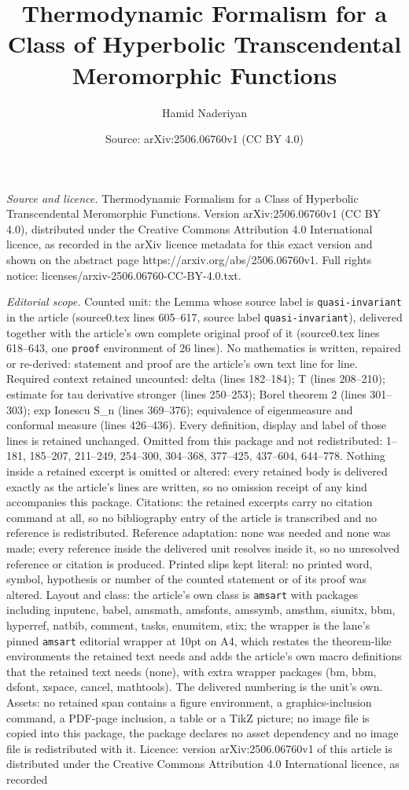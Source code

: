 \documentclass[10pt,a4paper]{amsart}
\title[Thermodynamic Formalism for a Class of Hyperbolic Transcende]{Thermodynamic Formalism for a Class of Hyperbolic Transcendental Meromorphic Functions}
\author{Hamid Naderiyan}
\date{Source: arXiv:2506.06760v1 (CC BY 4.0)}
\begin{document}
\maketitle

\noindent\emph{Source and licence.} Thermodynamic Formalism for a Class of Hyperbolic Transcendental Meromorphic Functions. Version arXiv:2506.06760v1 (CC BY 4.0), distributed under the Creative Commons Attribution 4.0 International licence, as recorded in the arXiv licence metadata for this exact version and shown on the abstract page https://arxiv.org/abs/2506.06760v1. Full rights notice: licenses/arxiv-2506.06760-CC-BY-4.0.txt.\par\smallskip

\noindent\textit{Editorial scope.} Counted unit: the Lemma whose source label is \texttt{quasi-invariant} in the article (source0.tex lines 605--617, source label \texttt{quasi-invariant}), delivered together with the article's own complete original proof of it (source0.tex lines 618--643, one \texttt{proof} environment of 26 lines). No mathematics is written, repaired or re-derived: statement and proof are the article's own text line for line. Required context retained uncounted: delta (lines 182--184); T (lines 208--210); estimate for tau derivative stronger (lines 250--253); Borel theorem 2 (lines 301--303); exp Ionescu S\_n (lines 369--376); equivalence of eigenmeasure and conformal measure (lines 426--436). Every definition, display and label of those lines is retained unchanged. Omitted from this package and not redistributed: 1--181, 185--207, 211--249, 254--300, 304--368, 377--425, 437--604, 644--778. Nothing inside a retained excerpt is omitted or altered: every retained body is delivered exactly as the article's lines are written, so no omission receipt of any kind accompanies this package. Citations: the retained excerpts carry no citation command at all, so no bibliography entry of the article is transcribed and no reference is redistributed. Reference adaptation: none was needed and none was made; every reference inside the delivered unit resolves inside it, so no unresolved reference or citation is produced. Printed slips kept literal: no printed word, symbol, hypothesis or number of the counted statement or of its proof was altered. Layout and class: the article's own class is \texttt{amsart} with packages including inputenc, babel, amsmath, amsfonts, amssymb, amsthm, siunitx, bbm, hyperref, natbib, comment, tasks, enumitem, stix; the wrapper is the lane's pinned \texttt{amsart} editorial wrapper at 10pt on A4, which restates the theorem-like environments the retained text needs and adds the article's own macro definitions that the retained text needs (none), with extra wrapper packages (bm, bbm, dsfont, xspace, cancel, mathtools). The delivered numbering is the unit's own. Assets: no retained span contains a figure environment, a graphics-inclusion command, a PDF-page inclusion, a table or a TikZ picture; no image file is copied into this package, the package declares no asset dependency and no image file is redistributed with it. Licence: version arXiv:2506.06760v1 of this article is distributed under the Creative Commons Attribution 4.0 International licence, as recorded 
\end{document}
